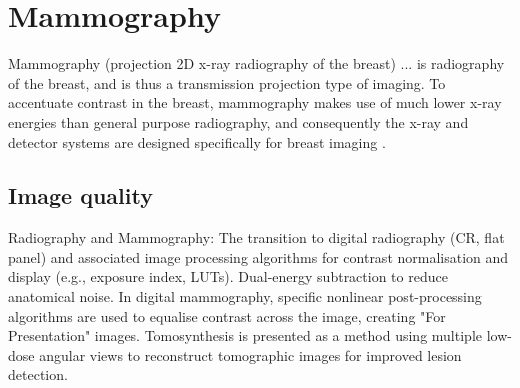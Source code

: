 \chapter{Mammography}

Mammography (projection 2D x-ray radiography of the breast) ... is
radiography of the breast, and is thus a transmission projection type
of imaging. To accentuate contrast in the breast, mammography makes
use of much lower x-ray energies than general purpose radiography, and
consequently the x-ray and detector systems are designed specifically
for breast imaging \cite{bushberg2011essential}.

\section{Image quality}

Radiography and Mammography: The transition to digital radiography
(CR, flat panel) and associated image processing algorithms for
contrast normalisation and display (e.g., exposure index,
LUTs). Dual-energy subtraction to reduce anatomical noise. In digital
mammography, specific nonlinear post-processing algorithms are used to
equalise contrast across the image, creating "For Presentation"
images. Tomosynthesis is presented as a method using multiple low-dose
angular views to reconstruct tomographic images for improved lesion
detection.
